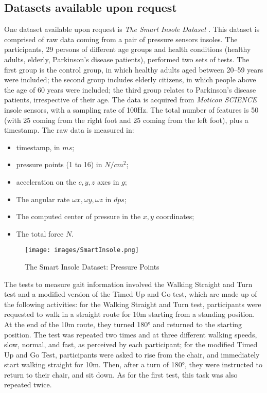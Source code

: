 \subsection{Datasets available upon request}
One dataset available upon request is \textit{The Smart Insole Dataset} \cite{TheSmartInsoleDataset}. This dataset is comprised of raw data coming from a pair of pressure sensors insoles.
The participants, 29 persons of different age groups and health conditions (healthy adults, elderly, Parkinson’s disease patients), performed two sets of tests. The first group is the control group, in which healthy adults aged between 20–59 years were included; the second group includes elderly citizens, in which people above the age of 60 years were included; the third group relates to Parkinson’s disease patients, irrespective of their age. 
The data is acquired from \textit{Moticon SCIENCE} insole sensors, with a sampling rate of 100Hz. The total number of features is 50 (with 25 coming from the right foot and 25 coming from the left foot), plus a timestamp. The raw data is measured in: 
\begin{itemize}
    \item timestamp, in \(ms\);
    \item pressure points (1 to 16) in \(N/cm^2\);
    \item acceleration on the \(c, y, z\) axes in \(g\);
    \item The angular rate \(\omega x, \omega y, \omega z\) in \(dps\);
    \item The computed center of pressure in the \(x,y\) coordinates;
    \item The total force \(N\).
\end{itemize}

\begin{figure}[h!]
    \centering
    \texttt{[image: images/SmartInsole.png]}
    \caption{The Smart Insole Dataset: Pressure Points}
    \label{fig:SmartInsole}
    \FloatBarrier
\end{figure}

The tests to measure gait information involved the Walking Straight and Turn test and a modified version of the Timed Up and Go test, which are made up of the following activities: for the Walking Straight and Turn test, participants were requested to walk in a straight route for 10m starting from a standing position. At the end of the 10m route, they turned 180° and returned to the starting position. The test was repeated two times and at three different walking speeds, slow, normal, and fast, as perceived by each participant; for the modified Timed Up and Go Test, participants were asked to rise from the chair, and immediately start walking straight for 10m. Then, after a turn of 180°, they were instructed to return to their chair, and sit down. As for the first test, this task was also repeated twice.

